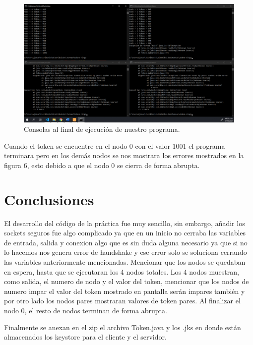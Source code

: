\documentclass[11pt]{article}
\begin{document}
		\begin{figure}[H]
			\centering
			\includegraphics[scale=0.34]{resources/ejecucionfin.png}
			\caption{Consolas al final de ejecución de nuestro programa.}\label{fig:picture}
		\end{figure}
		Cuando el token se encuentre en el nodo 0 con el valor 1001 el programa terminara pero en los demás nodos se nos mostrara los errores mostrados en la figura 6, esto debido a que el nodo 0 se cierra de forma abrupta.
	\section{Conclusiones}
	El desarrollo del código de la práctica fue muy sencillo, sin embargo, añadir los sockets seguros fue algo complicado ya que en un inicio no cerraba las variables de entrada, salida y conexion algo que es sin duda alguna necesario ya que si no lo hacemos nos genera error de handshake y ese error solo se soluciona cerrando las variables anteriormente mencionadas. Mencionar que los nodos se quedaban en espera, hasta que se ejecutaran los 4 nodos totales. Los 4 nodos muestran, como salida, el numero de nodo y el valor del token, mencionar que los nodos de numero impar el valor del token mostrado en pantalla serán impares también y por otro lado los nodos pares mostraran valores de token pares. Al finalizar el nodo 0, el resto de nodos terminan de forma abrupta. \par
	Finalmente se anexan en el zip el archivo Token.java y los .jks en donde están almacenados los keystore para el cliente y el servidor.
\end{document}
